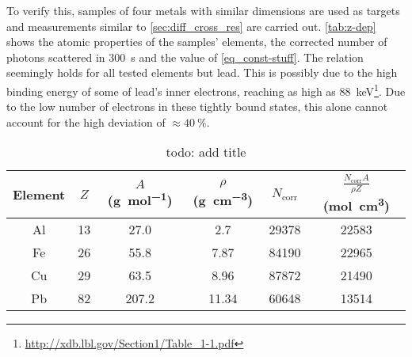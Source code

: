 To verify this, samples of four metals with similar dimensions are used as targets and measurements similar to \autoref{sec:diff_cross_res} are carried out.
\autoref{tab:z-dep} shows the atomic properties of the samples' elements, the corrected number of photons scattered in \SI{300}{\second} and the value of \autoref{eq_const-stuff}.
The relation seemingly holds for all tested elements but lead.
This is possibly due to the high binding energy of some of lead's inner electrons, reaching as high as \SI{88}{\kilo\eV}\footnote{\url{http://xdb.lbl.gov/Section1/Table_1-1.pdf}}.
Due to the low number of electrons in these tightly bound states, this alone cannot account for the high deviation of $\approx \SI{40}{\percent}$.

\begin{table}
	\centering
	\caption{todo: add title}
	\label{tab:z-dep}
	\begin{tabular}{cS[table-format=2.0]S[table-format=3.1]S[table-format=2.2]S[table-format=5.0]S[table-format=5.0]}
		\toprule
		{Element}&
		{$Z$}&
		{$A$ (\si{\gram\per\mole})}&
		{$\rho$ (\si{\gram\per\cubic\centi\meter})}&
		{$N_\text{corr}$}&
		{$\frac{N_\text{corr} A}{\rho Z}$ (\si{\mole\centi\meter\cubed})}\\
		\midrule
		Al&	13&	27.0&	2.7&	29378&	22583\\
		Fe&	26&	55.8&	7.87&	84190&	22965\\
		Cu&	29&	63.5&	8.96&	87872&	21490\\
		Pb&	82&	207.2&	11.34&	60648&	13514\\
		\bottomrule
	\end{tabular}
\end{table}
